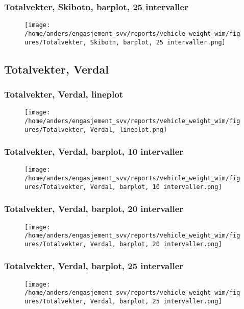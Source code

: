 \documentclass{article}
\begin{document}
\subsubsection{Totalvekter, Skibotn, barplot, 25 intervaller}
\begin{figure}[H]
\centering
\texttt{[image: /home/anders/engasjement\_svv/reports/vehicle\_weight\_wim/figures/Totalvekter, Skibotn, barplot, 25 intervaller.png]}
\end{figure}
\subsection{Totalvekter, Verdal}
\subsubsection{Totalvekter, Verdal, lineplot}
\begin{figure}[H]
\centering
\texttt{[image: /home/anders/engasjement\_svv/reports/vehicle\_weight\_wim/figures/Totalvekter, Verdal, lineplot.png]}
\end{figure}
\subsubsection{Totalvekter, Verdal, barplot, 10 intervaller}
\begin{figure}[H]
\centering
\texttt{[image: /home/anders/engasjement\_svv/reports/vehicle\_weight\_wim/figures/Totalvekter, Verdal, barplot, 10 intervaller.png]}
\end{figure}
\subsubsection{Totalvekter, Verdal, barplot, 20 intervaller}
\begin{figure}[H]
\centering
\texttt{[image: /home/anders/engasjement\_svv/reports/vehicle\_weight\_wim/figures/Totalvekter, Verdal, barplot, 20 intervaller.png]}
\end{figure}
\subsubsection{Totalvekter, Verdal, barplot, 25 intervaller}
\begin{figure}[H]
\centering
\texttt{[image: /home/anders/engasjement\_svv/reports/vehicle\_weight\_wim/figures/Totalvekter, Verdal, barplot, 25 intervaller.png]}
\end{figure}
\end{document}
